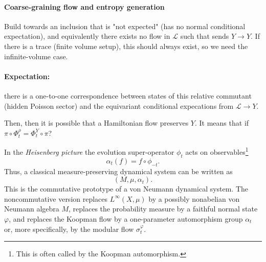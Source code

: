 \documentclass[a4paper,11pt]{article}
\theoremstyle{definition}
\newcommand{\mL}{\mathcal{L}}
\begin{document}


\paragraph{Coarse-graining flow and entropy generation}

Build towards an inclusion that is "not expected" (has no normal conditional expectation), and equivalently there exists no flow in $\mL$ such that sends $Y\to Y$. If there is a trace (finite volume setup), this should always exist, so we need the infinite-volume case.

\paragraph{Expectation:} there is a one-to-one correspondence between states of this relative commutant (hidden Poisson sector) and the equivariant conditional expecations from $\mL\to Y$.

Then, then it is possible that a Hamiltonian flow preserves $Y$. It means that if $\pi\circ \Phi_t^\rho=\Phi_t^Y\circ \pi$?





 In the {\it Heisenberg picture} the evolution super-operator \(\phi_t\) acts on observables\footnote{This is often called by the Koopman automorphism.}
\[
\alpha_t(f)=f\circ \phi_{-t}.
\]
Thus, a classical measure-preserving dynamical system can be written as
\[
(M,\mu,\alpha_t).
\]
This is the commutative prototype of a von Neumann dynamical system. The noncommutative version replaces \(L^\infty(X,\mu)\) by a possibly nonabelian von Neumann algebra \(M\), replaces the probability measure by a faithful normal state \(\varphi\), and replaces the Koopman flow by a one-parameter automorphism group \(\alpha_t\) or, more specifically, by the modular flow \(\sigma_t^\varphi\).
\end{document}
